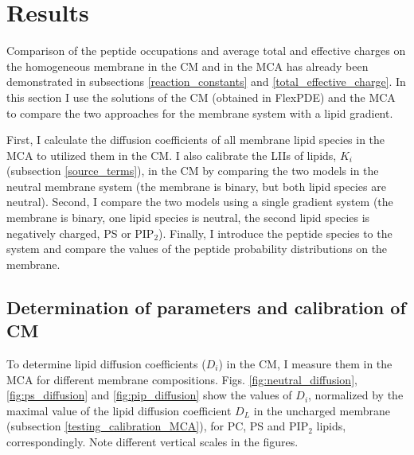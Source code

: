 \section{Results}

\label{continuous_results}

Comparison of the peptide occupations and average total and effective charges on the homogeneous membrane in the CM and in the MCA has already been demonstrated in subsections \ref{reaction_constants} and \ref{total_effective_charge}. In this section I use the solutions of the CM (obtained in FlexPDE) and the MCA to compare the two approaches for the membrane system with a lipid gradient.

First, I calculate the diffusion coefficients of all membrane lipid species in the MCA to utilized them in the CM. I also calibrate the LIIs of lipids, $K_i$ (subsection \ref{source_terms}), in the CM by comparing the two models in the neutral membrane system (the membrane is binary, but both lipid species are neutral). Second, I compare the two models using a single gradient system (the membrane is binary, one lipid species is neutral, the second lipid species is negatively charged, PS or PIP$_2$). Finally, I introduce the peptide species to the system and compare the values of the peptide probability distributions on the membrane.

\subsection{Determination of parameters and calibration of CM}

To determine lipid diffusion coefficients ($D_i$) in the CM, I measure them in the MCA for different membrane compositions. Figs. \ref{fig:neutral_diffusion}, \ref{fig:ps_diffusion} and \ref{fig:pip_diffusion} show the values of $D_i$, normalized by the maximal value of the lipid diffusion coefficient $D_L$ in the uncharged membrane (subsection \ref{testing_calibration_MCA}), for PC, PS and PIP$_2$ lipids, correspondingly. Note different vertical scales in the figures.

